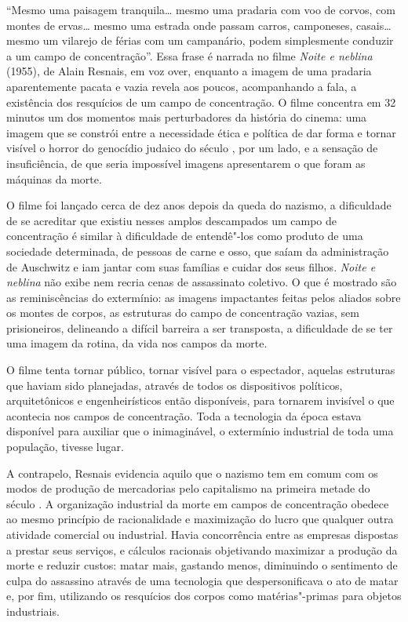 \asterisc

``Mesmo uma paisagem tranquila\ldots{} mesmo uma pradaria com voo de corvos,
com montes de ervas\ldots{} mesmo uma estrada onde passam carros, camponeses,
casais\ldots{} mesmo um vilarejo de férias com um campanário, podem
simplesmente conduzir a um campo de concentração''. Essa frase é
narrada no filme \emph{Noite e neblina} (1955), de Alain Resnais, em voz over,
enquanto a imagem de uma pradaria aparentemente pacata e vazia revela
aos poucos, acompanhando a fala, a existência dos resquícios de um campo
de concentração. O filme concentra em 32 minutos um dos momentos mais
perturbadores da história do cinema: uma imagem que se constrói entre a
necessidade ética e política de dar forma e tornar visível o horror do
genocídio judaico do século , por um lado, e a sensação de
insuficiência, de que seria impossível imagens apresentarem o que foram as máquinas da morte.

O filme foi lançado cerca de dez anos depois da queda do nazismo, a dificuldade de
se acreditar que existiu nesses amplos descampados um campo de
concentração é similar à dificuldade de entendê"-los como produto de uma
sociedade determinada, de pessoas de carne e osso, que saíam da
administração de Auschwitz e iam jantar com suas famílias e cuidar dos
seus filhos. \emph{Noite e neblina} não exibe nem recria cenas de
assassinato coletivo. O que é mostrado são as reminiscências do
extermínio: as imagens impactantes feitas pelos aliados sobre os montes
de corpos, as estruturas do campo de concentração vazias, sem
prisioneiros, delineando a difícil barreira a ser transposta, a
dificuldade de se ter uma imagem da rotina, da vida nos campos da morte.

O filme tenta tornar público, tornar visível para o espectador, aquelas
estruturas que haviam sido planejadas, através de todos os dispositivos
políticos, arquitetônicos e engenheirísticos então disponíveis, para
tornarem invisível o que acontecia nos campos de concentração. Toda a
tecnologia da época estava disponível para auxiliar que o inimaginável,
o extermínio industrial de toda uma população, tivesse lugar.

A contrapelo, Resnais evidencia aquilo que o nazismo tem
em comum com os modos de produção de mercadorias pelo capitalismo na
primeira metade do século . A organização industrial da morte em
campos de concentração obedece ao mesmo princípio de racionalidade e
maximização do lucro que qualquer outra atividade comercial ou
industrial. Havia concorrência entre as empresas dispostas a prestar
seus serviços, e cálculos racionais objetivando maximizar a produção da
morte e reduzir custos: matar mais, gastando menos, diminuindo o
sentimento de culpa do assassino através de uma tecnologia que
despersonificava o ato de matar e, por fim, utilizando os resquícios dos
corpos como matérias"-primas para objetos industriais.

